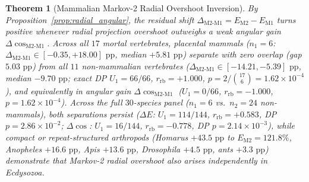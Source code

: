 \documentclass[11pt,a4paper]{article}
\renewcommand{\_}{\origunderscore\penalty200\relax}
\newtheorem{theorem}{Theorem}[section]
\theoremstyle{remark}
\begin{document}
\begin{theorem}[Mammalian Markov-2 Radial Overshoot Inversion]
\label{thm:L8e}
By Proposition~\ref{prop:radial_angular}, the residual shift $\Delta_{\mathrm{M2\text{-}M1}} = E_{\mathrm{M2}} - E_{\mathrm{M1}}$ turns positive whenever radial projection overshoot outweighs a weak angular gain $\Delta\cos_{\mathrm{M2\text{-}M1}}$. Across all $17$ mortal vertebrates, placental mammals ($n_1=6$: $\Delta_{\mathrm{M2\text{-}M1}} \in [-0.35, +18.00]\text{ pp}$, median $+5.81\text{ pp}$) separate with zero overlap (gap $5.03\text{ pp}$) from all $11$ non-mammalian vertebrates ($\Delta_{\mathrm{M2\text{-}M1}} \in [-14.21, -5.39]\text{ pp}$, median $-9.70\text{ pp}$; exact DP $U_1 = 66/66$, $r_{\mathrm{rb}} = +1.000$, $p = 2/\binom{17}{6} = 1.62 \times 10^{-4}$), and equivalently in angular gain $\Delta\cos_{\mathrm{M2\text{-}M1}}$ ($U_1 = 0/66$, $r_{\mathrm{rb}} = -1.000$, $p = 1.62 \times 10^{-4}$). Across the full $30$-species panel ($n_1=6$ vs.\ $n_2=24$ non-mammals), both separations persist ($\Delta E$: $U_1 = 114/144$, $r_{\mathrm{rb}} = +0.583$, DP $p = 2.86 \times 10^{-2}$; $\Delta\cos$: $U_1 = 16/144$, $r_{\mathrm{rb}} = -0.778$, DP $p = 2.14 \times 10^{-3}$), while compact or repeat-structured arthropods (\textit{Homarus} $+43.5\text{ pp}$ to $E_{\mathrm{M2}}=121.8\%$, \textit{Anopheles} $+16.6\text{ pp}$, \textit{Apis} $+13.6\text{ pp}$, \textit{Drosophila} $+4.5\text{ pp}$, ants $+3.3\text{ pp}$) demonstrate that Markov-2 radial overshoot also arises independently in Ecdysozoa.
\end{theorem}
\end{document}

